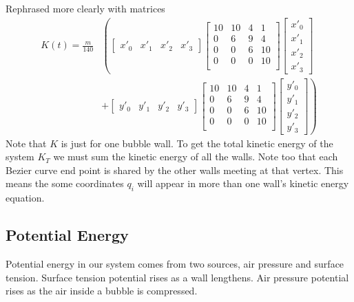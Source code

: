 \documentclass{article}
\begin{document}
Rephrased more clearly with matrices
\begin{align}
K(t)=
\frac{m}{140} &\left(
\begin{bmatrix} x'_0 & x'_1 & x'_2 & x'_3 \end{bmatrix}
 \begin{bmatrix} 
10 & 10 & 4 & 1\\
0 & 6 & 9 & 4\\
0 & 0 & 6 & 10\\
0 & 0 & 0 & 10\\ 
\end{bmatrix}
\begin{bmatrix} x'_0\\x'_1\\x'_2\\x'_3 \end{bmatrix}
\right.\\
&+ \left.
\begin{bmatrix} y'_0 & y'_1 & y'_2 & y'_3 \end{bmatrix}
 \begin{bmatrix} 
10 & 10 & 4 & 1\\
0 & 6 & 9 & 4\\
0 & 0 & 6 & 10\\
0 & 0 & 0 & 10\\ 
\end{bmatrix}
\begin{bmatrix} y'_0\\y'_1\\y'_2\\y'_3 \end{bmatrix} 
\right)\nonumber
\end{align}
Note that $K$ is just for one bubble wall. To get the total
kinetic energy of the system $K_T$ we must sum the kinetic energy of all the
walls. Note too that each Bezier curve end point is shared by the other walls
meeting at that vertex. This means the some coordinates $q_i$ will appear in
more than one wall's kinetic energy equation.
\subsection{Potential Energy}
Potential energy in our system comes from two sources, air pressure and surface
tension. Surface tension potential rises as a wall lengthens.
Air pressure potential rises as the air inside a bubble is compressed.
\end{document}
